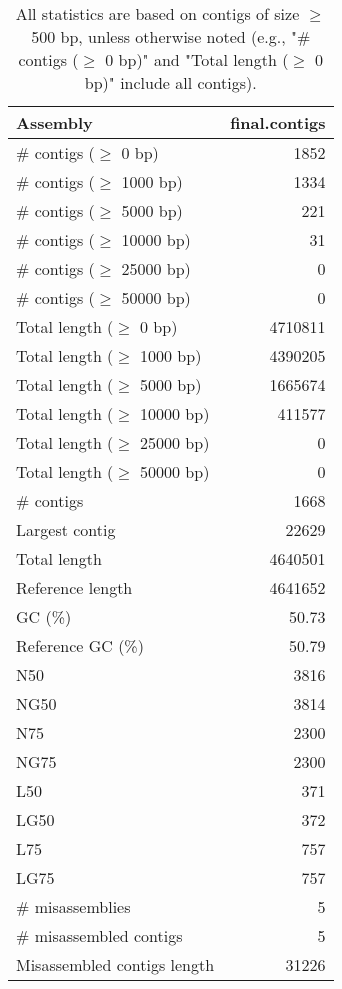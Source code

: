\documentclass[12pt,a4paper]{article}
\begin{document}
\begin{table}[ht]
\begin{center}
\caption{All statistics are based on contigs of size $\geq$ 500 bp, unless otherwise noted (e.g., "\# contigs ($\geq$ 0 bp)" and "Total length ($\geq$ 0 bp)" include all contigs).}
\begin{tabular}{|l*{1}{|r}|}
\hline
Assembly & final.contigs \\ \hline
\# contigs ($\geq$ 0 bp) & 1852 \\ \hline
\# contigs ($\geq$ 1000 bp) & 1334 \\ \hline
\# contigs ($\geq$ 5000 bp) & 221 \\ \hline
\# contigs ($\geq$ 10000 bp) & 31 \\ \hline
\# contigs ($\geq$ 25000 bp) & 0 \\ \hline
\# contigs ($\geq$ 50000 bp) & 0 \\ \hline
Total length ($\geq$ 0 bp) & 4710811 \\ \hline
Total length ($\geq$ 1000 bp) & 4390205 \\ \hline
Total length ($\geq$ 5000 bp) & 1665674 \\ \hline
Total length ($\geq$ 10000 bp) & 411577 \\ \hline
Total length ($\geq$ 25000 bp) & 0 \\ \hline
Total length ($\geq$ 50000 bp) & 0 \\ \hline
\# contigs & 1668 \\ \hline
Largest contig & 22629 \\ \hline
Total length & 4640501 \\ \hline
Reference length & 4641652 \\ \hline
GC (\%) & 50.73 \\ \hline
Reference GC (\%) & 50.79 \\ \hline
N50 & 3816 \\ \hline
NG50 & 3814 \\ \hline
N75 & 2300 \\ \hline
NG75 & 2300 \\ \hline
L50 & 371 \\ \hline
LG50 & 372 \\ \hline
L75 & 757 \\ \hline
LG75 & 757 \\ \hline
\# misassemblies & 5 \\ \hline
\# misassembled contigs & 5 \\ \hline
Misassembled contigs length & 31226 \\ \hline

\end{tabular}
\end{center}
\end{table}
\end{document}
